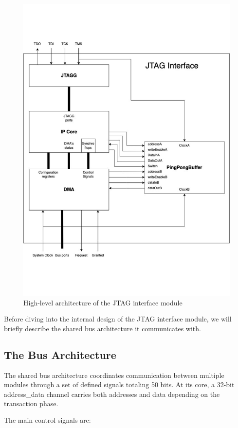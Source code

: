 \documentclass[a4paper,11pt,oneside]{report}
\begin{document}
\begin{figure}
    \centering
    \includegraphics[width=0.9\linewidth]{figures/jtag_interface_overview.pdf}
    \caption{High-level architecture of the JTAG interface module}
    \label{fig:big_picture}
\end{figure}

Before diving into the internal design of the JTAG interface module, we will briefly describe the shared bus architecture it communicates with.

\subsection{The Bus Architecture}

The shared bus architecture coordinates communication between multiple modules through a set of defined signals totaling 50 bits.
At its core, a 32-bit address\_data channel carries both addresses and data depending on the transaction phase.

The main control signals are:
\end{document}
